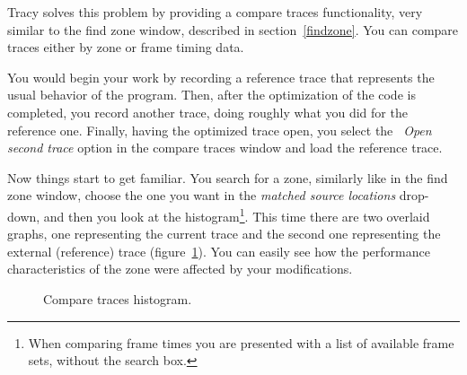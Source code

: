 \documentclass[hidelinks,titlepage,a4paper,twoside]{article}
\begin{document}
Tracy solves this problem by providing a compare traces functionality, very similar to the find zone window, described in section~\ref{findzone}. You can compare traces either by zone or frame timing data.

You would begin your work by recording a reference trace that represents the usual behavior of the program. Then, after the optimization of the code is completed, you record another trace, doing roughly what you did for the reference one. Finally, having the optimized trace open, you select the \emph{\faFolderOpen{}~Open second trace} option in the compare traces window and load the reference trace.

Now things start to get familiar. You search for a zone, similarly like in the find zone window, choose the one you want in the \emph{matched source locations} drop-down, and then you look at the histogram\footnote{When comparing frame times you are presented with a list of available frame sets, without the search box.}. This time there are two overlaid graphs, one representing the current trace and the second one representing the external (reference) trace (figure~\ref{comparehistogram}). You can easily see how the performance characteristics of the zone were affected by your modifications.

\begin{figure}[h]
\centering{}
\caption{Compare traces histogram.}
\label{comparehistogram}
\end{figure}
\end{document}
